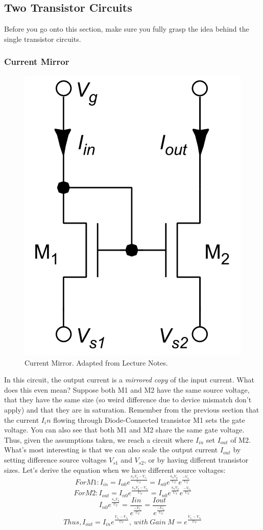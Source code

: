 \subsection{Two Transistor Circuits}
Before you go onto this section, make sure you fully grasp the idea behind the single transistor circuits. 
\subsubsection{Current Mirror}
\begin{figure}[H]
    \centering
    \includegraphics[width=0.2\linewidth]{../../Figures/Current_Mirror.PNG}
    \caption{Current Mirror. Adapted from Lecture Notes.}
    \label{fig:N-Type Current Mirror}
\end{figure}
In this circuit, the output current is a \emph{mirrored copy} of the input current. What does this even mean? Suppose both M1 and M2 have the same source voltage, that they have the same size (so weird difference due to device mismatch don't apply) and that they are in saturation. Remember from the previous section that the current $I_in$ flowing through Diode-Connected transistor M1 sets the gate voltage. You can also see that both M1 and M2 share the same gate voltage. Thus, given the assumptions taken, we reach a circuit where $I_{in}$ set $I_{out}$ of M2. What's most interesting is that we can also scale the output current $I_{out}$ by setting difference source voltages $V_{s1}$ and $V_{s2}$, or by having different transistor sizes. Let's derive the equation when we have different source voltages: 
\begin{equation}
For M1: I_{in} = I_{n0} e^{\frac{\kappa_{n}V_g - V_{s_1}}{U_T}} = I_{n0} e^{\frac{\kappa_{n}V_g }{U_T}}e^{\frac{-V_{s_1}}{U_T}}
\end{equation}
\begin{equation}
For M2: I_{out} = I_{n0} e^{\frac{\kappa_{n}V_g - V_{s_2}}{U_T}} = I_{n0} e^{\frac{\kappa_{n}V_g }{U_T}}e^{\frac{-V_{s_2}}{U_T}}
\end{equation}
\begin{equation}
I_{n0} e^{\frac{\kappa_{n}V_g }{U_T}} = \frac{I{in}}{e^{\frac{-V_{s_1}}{U_T}}} = \frac{I{out}}{e^{\frac{-V_{s_2}}{U_T}}}
\end{equation}
\begin{equation}
Thus, I_{out} = I_{in} e^{\frac{V_{s_1} - V_{s_2}}{U_T}}, \ with \ Gain \ M = e^{\frac{V_{s_1} - V_{s_2}}{U_T}}
\end{equation}

